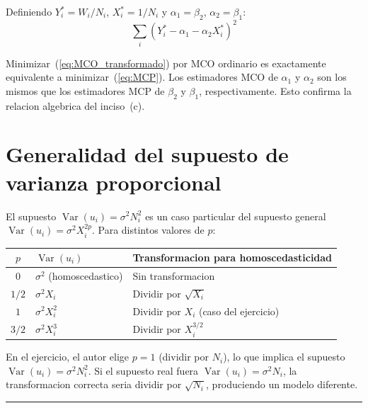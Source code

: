 \documentclass[12pt, letterpaper]{article}
\theoremstyle{remark}
\newcommand{\Var}{\operatorname{Var}}
\begin{document}
Definiendo $Y_i^* = W_i/N_i$, $X_i^* = 1/N_i$ y $\alpha_1 = \beta_2$, $\alpha_2 = \beta_1$:
\begin{equation}
  \sum_i (Y_i^* - \alpha_1 - \alpha_2 X_i^*)^2
  \label{eq:MCO_transformado}
\end{equation}

Minimizar~(\ref{eq:MCO_transformado}) por MCO ordinario es exactamente
equivalente a minimizar~(\ref{eq:MCP}). Los estimadores MCO de $\alpha_1$ y
$\alpha_2$ son los mismos que los estimadores MCP de $\beta_2$ y $\beta_1$,
respectivamente. Esto confirma la relacion algebrica del inciso~(c).

\section{Generalidad del supuesto de varianza proporcional}

El supuesto $\Var(u_i) = \sigma^2 N_i^2$ es un caso particular del supuesto
general $\Var(u_i) = \sigma^2 X_i^{2p}$. Para distintos valores de $p$:

\begin{center}
\small
\begin{tabular}{cll}
\toprule
$p$ & $\Var(u_i)$ & Transformacion para homoscedasticidad \\
\midrule
$0$ & $\sigma^2$ (homoscedastico) & Sin transformacion \\
$1/2$ & $\sigma^2 X_i$ & Dividir por $\sqrt{X_i}$ \\
$1$ & $\sigma^2 X_i^2$ & Dividir por $X_i$ (caso del ejercicio) \\
$3/2$ & $\sigma^2 X_i^3$ & Dividir por $X_i^{3/2}$ \\
\bottomrule
\end{tabular}
\end{center}

\noindent En el ejercicio, el autor elige $p = 1$ (dividir por $N_i$), lo que
implica el supuesto $\Var(u_i) = \sigma^2 N_i^2$. Si el supuesto real fuera
$\Var(u_i) = \sigma^2 N_i$, la transformacion correcta seria dividir por
$\sqrt{N_i}$, produciendo un modelo diferente.

\vspace{14pt}
\noindent\rule{\linewidth}{0.4pt}

\end{document}
